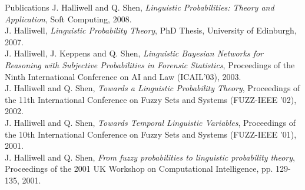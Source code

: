 \documentclass{resume} %
\begin{document}
\begin{rSection}{Publications}
J. Halliwell and Q. Shen, {\em Linguistic Probabilities: Theory and Application}, Soft Computing, 2008.\\
J. Halliwell, {\em Linguistic Probability Theory}, PhD Thesis, University of Edinburgh, 2007.\\
J. Halliwell, J. Keppens and Q. Shen, {\em Linguistic Bayesian Networks for Reasoning with
Subjective Probabilities in Forensic Statistics}, Proceedings of the Ninth International
Conference on AI and Law (ICAIL'03), 2003.\\
J. Halliwell and Q. Shen, {\em Towards a Linguistic Probability Theory}, Proceedings of the
11th International Conference on Fuzzy Sets and Systems (FUZZ-IEEE '02), 2002.\\
J. Halliwell and Q. Shen, {\em Towards Temporal Linguistic Variables}, Proceedings of the
10th International Conference on Fuzzy Sets and Systems (FUZZ-IEEE '01), 2001.\\
J. Halliwell and Q. Shen, {\em From fuzzy probabilities to linguistic probability theory},
Proceedings of the 2001 UK Workshop on Computational Intelligence, pp. 129-135,
2001.\\
\end{rSection}


\end{document}

